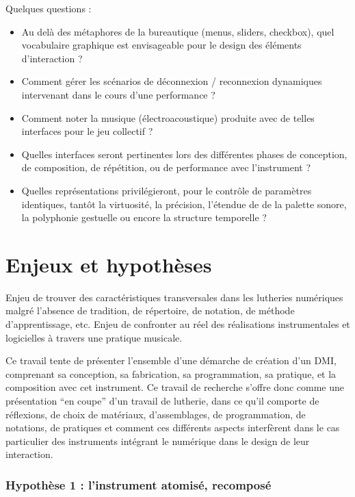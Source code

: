 Quelques questions : 
\vspace{-1em}
\begin{itemize}[noitemsep]
\item Au delà des métaphores de la bureautique (menus, sliders, checkbox), quel vocabulaire graphique est envisageable pour le design des éléments d'interaction ?
\item Comment gérer les scénarios de déconnexion / reconnexion dynamiques intervenant dans le cours d'une performance ?
\item Comment noter la musique (électroacoustique) produite avec de telles interfaces pour le jeu collectif ?
\item Quelles interfaces seront pertinentes lors des différentes phases de conception, de composition, de répétition, ou de performance avec l'instrument ?
\item  Quelles représentations privilégieront, pour le contrôle de paramètres identiques, tantôt la virtuosité, la précision, l'étendue de de la palette sonore, la polyphonie gestuelle ou encore la structure temporelle ?
\end{itemize}

\section{Enjeux et hypothèses}

Enjeu de trouver des caractéristiques transversales dans les lutheries numériques malgré l'absence de tradition, de répertoire, de notation, de méthode d'apprentissage, etc.
Enjeu de confronter au réel des réalisations instrumentales et logicielles à travers une pratique musicale.

Ce travail tente de présenter l'ensemble d'une démarche de création d'un \gls{DMI}, comprenant sa conception, sa fabrication, sa programmation, sa pratique, et la composition avec cet instrument.
Ce travail de recherche s'offre donc comme une présentation ``en coupe'' d'un travail de lutherie, dans ce qu'il comporte de réflexions, de choix de matériaux, d'assemblages, de programmation, de notations, de pratiques et comment ces différents aspects interfèrent dans le cas particulier des instruments intégrant le numérique dans le design de leur interaction.

\subsubsection*{Hypothèse 1 : l'instrument atomisé, recomposé}

